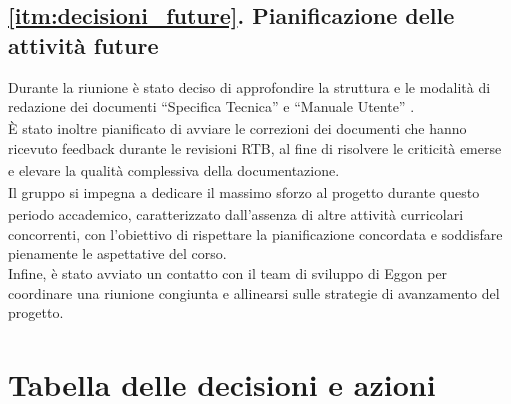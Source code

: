 \documentclass[a4paper,12pt]{article}
\begin{document}
\subsection*{\ref{itm:decisioni_future}. Pianificazione delle attività future}
Durante la riunione è stato deciso di approfondire la struttura e le modalità di redazione dei documenti ``Specifica Tecnica\textsubscript{}'' e ``Manuale Utente\textsubscript{}''  .\\
È stato inoltre pianificato di avviare le correzioni dei documenti che hanno ricevuto feedback durante le revisioni RTB\textsubscript{}, al fine di risolvere le criticità emerse e elevare la qualità\textsubscript{} complessiva della documentazione.\\
Il gruppo si impegna a dedicare il massimo sforzo al progetto\textsubscript{} durante questo periodo accademico, caratterizzato dall'assenza di altre attività curricolari 
concorrenti, con l'obiettivo di rispettare la pianificazione concordata e soddisfare pienamente le aspettative del corso.\\
Infine, è stato avviato un contatto con il team di sviluppo di Eggon per coordinare una riunione congiunta e allinearsi sulle strategie di avanzamento del progetto\textsubscript{}.\\


\section{Tabella delle decisioni e azioni}

\setlength{\extrarowheight}{2pt} %
\renewcommand{\arraystretch}{1.5} 
\end{document}
